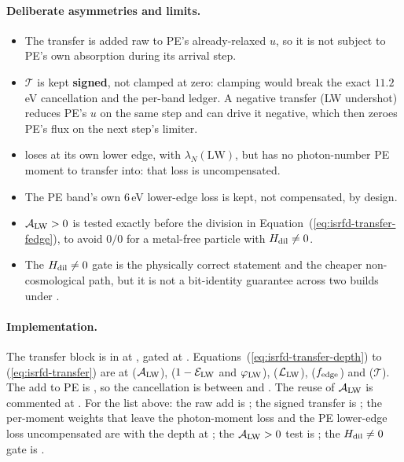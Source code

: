 \paragraph{Deliberate asymmetries and limits.}

\begin{itemize}
  \item The transfer is added raw to PE's already-relaxed $u$, so it is not
    subject to PE's own absorption during its arrival step.
  \item $\mathcal{T}$ is kept \textbf{signed}, not clamped at zero: clamping
    would break the exact $11.2$\,eV cancellation and the per-band ledger. A
    negative transfer (LW undershot) reduces PE's $u$ on the same step and can
    drive it negative, which then zeroes PE's flux on the next step's limiter.
  \item {} loses at its own lower edge, with
    $\lambda_N(\mathrm{LW})$, but has no photon-number PE moment to transfer
    into: that loss is uncompensated.
  \item The PE band's own $6$\,eV lower-edge loss is kept, not compensated, by
    design.
  \item $\mathcal{A}_{\rm LW} > 0$ is tested exactly before the division in
    Equation~(\ref{eq:isrfd-transfer-fedge}), to avoid $0/0$ for a metal-free
    particle with $H_{\rm dil} \ne 0$.
  \item The $H_{\rm dil} \ne 0$ gate is the physically correct statement and the
    cheaper non-cosmological path, but it is not a bit-identity guarantee
    across two builds under .
\end{itemize}

\paragraph{Implementation.} The transfer block is in
 at ,
gated at . Equations~(\ref{eq:isrfd-transfer-depth})
to (\ref{eq:isrfd-transfer}) are at 
($\mathcal{A}_{\rm LW}$),  ($1-\mathcal{E}_{\rm LW}$ and
$\varphi_{\rm LW}$),  ($\mathcal{L}_{\rm LW}$), 
($f_{\rm edge}$) and  ($\mathcal{T}$). The add to PE is
, so the cancellation is between  and
. The reuse of $\mathcal{A}_{\rm LW}$ is commented at
. For the list above: the raw add is
; the signed transfer is ; the
per-moment weights that leave the photon-moment loss and the PE lower-edge loss
uncompensated are  with the depth at ;
the $\mathcal{A}_{\rm LW} > 0$ test is ; the $H_{\rm dil} \ne 0$
gate is .

